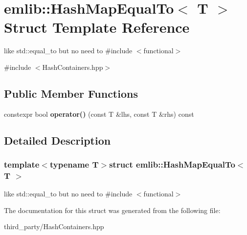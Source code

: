 \hypertarget{structemlib_1_1_hash_map_equal_to}{\section{emlib\+:\+:Hash\+Map\+Equal\+To$<$ T $>$ Struct Template Reference}
\label{structemlib_1_1_hash_map_equal_to}
}


like std\+::equal\+\_\+to but no need to \#include $<$functional$>$  




{\ttfamily \#include $<$Hash\+Containers.\+hpp$>$}

\subsection*{Public Member Functions}
\begin{DoxyCompactItemize}
\item 
\hypertarget{structemlib_1_1_hash_map_equal_to_ac2ea0966fd7290390cc42fa062c209bb}{constexpr bool {\bfseries operator()} (const T \&lhs, const T \&rhs) const }\label{structemlib_1_1_hash_map_equal_to_ac2ea0966fd7290390cc42fa062c209bb}

\end{DoxyCompactItemize}


\subsection{Detailed Description}
\subsubsection*{template$<$typename T$>$struct emlib\+::\+Hash\+Map\+Equal\+To$<$ T $>$}

like std\+::equal\+\_\+to but no need to \#include $<$functional$>$ 

The documentation for this struct was generated from the following file\+:\begin{DoxyCompactItemize}
\item 
third\+\_\+party/Hash\+Containers.\+hpp\end{DoxyCompactItemize}

